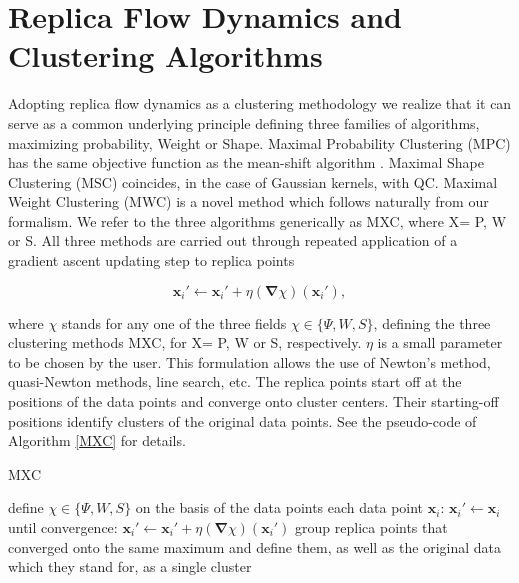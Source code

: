 \documentclass[preprint,12pt]{elsarticle}
\begin{document}
\section{Replica Flow Dynamics and Clustering Algorithms}
\label{replica}
Adopting replica flow dynamics as a clustering methodology we realize that it can serve as a common underlying principle defining three families of algorithms, maximizing probability, Weight or Shape. Maximal Probability Clustering (MPC) has the same objective function as the mean-shift algorithm \cite{cheng1995}. Maximal Shape Clustering (MSC) coincides, in the case of Gaussian kernels, with QC. Maximal Weight Clustering (MWC) is a novel method which follows naturally from our formalism. We refer to the three algorithms generically as MXC, where X= P, W or S. All three methods are carried out through repeated application of a gradient ascent updating step to replica points

\begin{equation}\label{gradient_descent_step}
  \mathbf{x}_i' \gets \mathbf{x}_i'+\eta\left(\boldsymbol{\nabla}\chi\right)\left(\mathbf{x}_i'\right),
\end{equation}

where $\chi$ stands for any one of the three fields $\chi \in \{\Psi,W,S\}$, defining the three clustering methods MXC, for X= P, W or S, respectively. $\eta$ is a small parameter to be chosen by the user. This formulation allows the use of Newton's method, quasi-Newton methods, line search, etc. The replica points start off at the positions of the data points and converge onto cluster centers. Their starting-off positions identify clusters of the original data points. See the pseudo-code of Algorithm \ref{MXC} for details.

\begin{algorithm}
\caption{MXC}\label{MXC}
\begin{algorithmic}[1]
\State define $\chi\in \{\Psi,W,S\}$ on the basis of the data points
\MFor each data point $\mathbf{x}_i$:
	\State $\mathbf{x}_i' \gets \mathbf{x}_i$
	\MRepeat until convergence:
		\State $\mathbf{x}_i' \gets \mathbf{x}_i'+\eta\left(\boldsymbol{\nabla}\chi\right)\left(\mathbf{x}_i'\right)$  
	\EndMRepeat
\EndMFor
\State group replica points that converged onto the same maximum and define them, as well as the original data which they stand for, as a single cluster
\end{algorithmic}
\end{algorithm}
\end{document}
